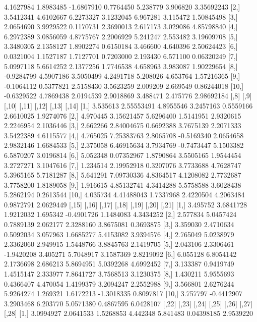 \documentclass[12pt]{article}
\begin{document}
\begin{Schunk}
\begin{Soutput}
 [1,]  4.1627984 1.8983485 -1.6867910 0.7764450 5.238779 3.906820 3.35692243
 [2,]  3.5412341 4.6102667  6.2273327 3.1232045 6.967281 3.115472 1.50845498
 [3,]  2.0654690 3.9929522  0.1170731 2.3690013 2.617173 3.029086 4.85798840
 [4,]  6.2972389 3.0856059  4.8775767 2.2006929 5.241247 2.553482 3.19609708
 [5,]  3.3480305 2.1358127  1.8902274 0.6150184 3.466600 4.640396 2.50624423
 [6,]  0.0321004 1.1527187  1.7127701 0.7203000 2.193430 6.571100 0.06320249
 [7,]  5.0997118 5.6614252  2.1377256 1.7746538 4.658963 3.983087 1.90229654
 [8,] -0.9284799 4.5907186  3.5050499 4.2491718 5.208026 4.653764 1.57216365
 [9,] -0.1064112 0.5377821  2.5158430 3.5623259 2.009209 2.669549 0.86244018
[10,] -0.6329522 4.7869438  2.0194539 2.9018869 3.488471 2.475776 2.98692184
          [,8]       [,9]     [,10]      [,11]     [,12]     [,13]     [,14]
 [1,] 3.535613 2.55553491 4.8955546  3.2457163 0.5559166 2.6610025 1.9274076
 [2,] 4.970445 3.15621457 5.6296400  1.5141951 2.9320615 2.2246954 2.1036446
 [3,] 2.662266 2.84004675 0.6692388  3.7675139 2.2071333 3.5422389 4.6115577
 [4,] 4.765025 7.25383763 2.8065708 -0.5169340 2.0654658 2.9832146 1.6684533
 [5,] 2.375058 6.46915634 3.7934769 -0.7473447 5.1503382 6.5870207 3.0196814
 [6,] 5.052348 0.07352967 1.8790864  3.5505165 1.9544454 3.2727271 3.1047616
 [7,] 1.234514 2.19952918 0.3207076  3.7733688 4.7628747 5.3965165 5.7181287
 [8,] 5.641291 7.09730336 4.8364517  4.1208082 2.7732687 3.7758200 1.8189058
 [9,] 1.916615 4.85132741 4.3414288  5.5758588 3.6028438 5.2862194 0.2613544
[10,] 4.035734 4.41488043 1.7337968  2.4220504 4.2063484 0.9872791 2.0629449
         [,15]      [,16]      [,17]    [,18]      [,19]      [,20]     [,21]
 [1,] 3.495752  3.6841728  1.9212032 1.695342 -0.4901726  1.1484083 4.3434252
 [2,] 2.577834  5.0457424  0.7889139 2.062177  2.3288160  3.8675081 0.3693875
 [3,] 3.359030  2.4710634  0.5092034 3.057963  1.6685277  5.4153082 3.9394576
 [4,] 2.765049  5.0238979  2.3362060 2.949915  1.5448766  3.8845763 2.1419705
 [5,] 2.043106  2.3306461 -1.9420208 3.405271  5.7048917  3.1587369 2.8219092
 [6,] 6.055128  6.8054142  2.1736698 2.686213  5.8694951  5.0392268 4.6992452
 [7,] 3.133387  0.9419749  1.4515147 2.333977  7.8641727  3.7568513 3.1230375
 [8,] 1.430211  5.9555693  0.4366407 4.470054  1.4199379  3.2094247 2.2552988
 [9,] 3.566801  2.6276244  5.9264274 1.269321  1.6172213 -1.3018335 0.8097817
[10,] 3.757797 -0.4412907  3.2903468 6.203770  5.0571380  0.4867595 6.0428107
          [,22]     [,23]      [,24]    [,25]    [,26]      [,27]      [,28]
 [1,] 3.0994927 2.0641533  1.5268853 4.442348 5.841483 0.04398185  2.9539220

\end{Soutput}
\end{Schunk}
\end{document}
